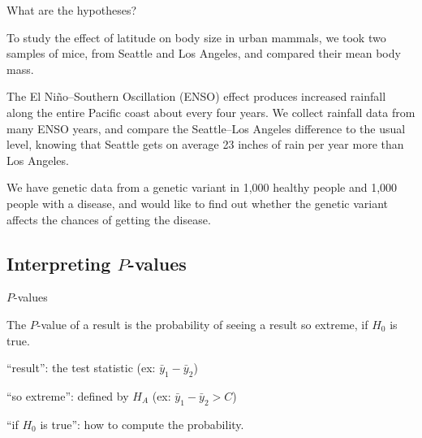 \begin{frame}{What are the hypotheses?}

  To study the effect of latitude on body size in urban mammals, 
  we took two samples of mice, from Seattle and Los Angeles,
  and compared their mean body mass.

    \vspace{2em}
    \pause

  The El Ni\~no--Southern Oscillation (ENSO) effect produces increased rainfall along the entire Pacific coast about every four years.
  We collect rainfall data from many ENSO years, and compare the Seattle--Los Angeles difference to the usual level,
  knowing that Seattle gets on average 23 inches of rain per year more than Los Angeles.


    \vspace{2em}
    \pause

  We have genetic data from a genetic variant in 1,000 healthy people and 1,000 people with a disease,
  and would like to find out whether the genetic variant affects the chances of getting the disease.

\end{frame}



\subsection{Interpreting $P$-values}


\begin{frame}{$P$-values}

    \begin{block}{}
      The \alert<1>{$P$-value} of a \alert<2>{result} is the probability of seeing a result \alert<3>{so extreme}, \alert<4>{if $H_0$ is true}.
    \end{block}

    \vspace{2em}
          \pause

    \begin{itemizew}{4em}
        \item[``result'':] the test statistic (ex: $\bar y_1 - \bar y_2$)
          \pause
        \item[``so extreme'':] defined by $H_A$ (ex: $\bar y_1 - \bar y_2 > C$)
          \pause
        \item[``if $H_0$ is true'':] how to compute the probability.
    \end{itemizew}

\end{frame}


